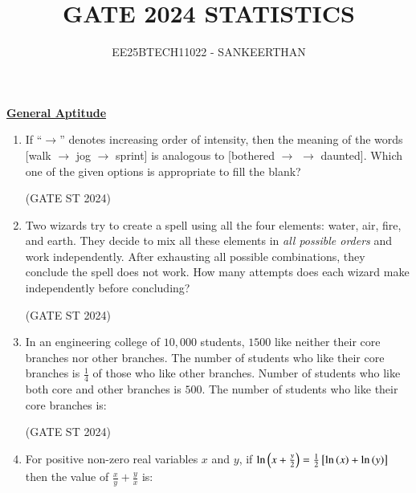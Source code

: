 \documentclass[journal,12pt,onecolumn]{IEEEtran}
\title{GATE 2024 STATISTICS}
\author{EE25BTECH11022 - SANKEERTHAN }
\date{}
\theoremstyle{remark}
\begin{document}
\maketitle
\textbf{\underline{General Aptitude}}

\begin{enumerate}
\item 
If ``$\rightarrow$'' denotes increasing order of intensity, then the meaning of the words  
[walk $\rightarrow$ jog $\rightarrow$ sprint] is analogous to [bothered $\rightarrow$ \underline{\phantom{imagine}} $\rightarrow$ daunted].  
Which one of the given options is appropriate to fill the blank?

\begin{enumerate}
\end{enumerate}
\hfill (GATE ST 2024)
\item 
Two wizards try to create a spell using all the four elements: water, air, fire, and earth.  
They decide to mix all these elements in \emph{all possible orders} and work independently.  
After exhausting all possible combinations, they conclude the spell does not work.  
How many attempts does each wizard make independently before concluding?


\begin{enumerate}
\end{enumerate}
\hfill (GATE ST 2024)
\item 
In an engineering college of $10,000$ students, $1500$ like neither their core branches nor other branches.  
The number of students who like their core branches is $\frac{1}{4}$ of those who like other branches.  
Number of students who like both core and other branches is $500$.  
The number of students who like their core branches is:

\begin{enumerate}
\end{enumerate}
\hfill (GATE ST 2024)
\item 
For positive non-zero real variables $x$ and $y$, if
$
\ln\left(x + \frac{y}{2}\right)= \frac12{}\left[ \ln\left(x\right) + \ln\left(y\right) \right]
$
then the value of $\frac{x}{y} + \frac{y}{x}$ is:


\end{enumerate}
\end{document}
